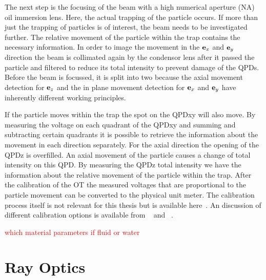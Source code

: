 The next step is the focusing of the beam with a high numerical aperture (NA) 
oil immersion lens. Here, the actual trapping of the particle occurs. If more 
than just the trapping of particles is of interest, the beam needs to be 
investigated further. The relative movement of the particle within the trap 
contains the necessary information. In order to image the movement in the $\vb{e}_{x}$ 
and $\vb{e}_{y}$ direction the beam is collimated again by the condensor lens after it 
passed the particle and filtered to reduce its total intensity to prevent 
damage of the QPDs. Before the beam is focussed, it is split into two because 
the axial movement detection for $\vb{e}_{z}$ and the in plane movement detection for 
$\vb{e}_{x}$ and $\vb{e}_{y}$ have inherently different working principles.

If the particle moves within the trap the spot on the QPDxy will also move. By 
measuring the voltage on each quadrant of the QPDxy and summing and subtracting 
certain quadrants it is possible to retrieve the information about the movement 
in each direction separately. For the axial direction the opening of the QPDz 
is overfilled. An axial movement of the particle causes a change of total 
intensity on this QPD. By measuring the QPDz total intensity we have the 
information about the relative movement of the particle within the trap. After 
the calibration of the OT the measured voltages that are proportional to the 
particle movement can be converted to the physical unit meter. The calibration 
process itself is not relevant for this thesis but is available 
here~\cite{Lamprecht2017}. An discussion of different calibration options is 
available from \citeauthor{Svoboda1994}~\cite{Svoboda1994} and 
\citeauthor{Jun2004}~\cite{Jun2004}.


\textcolor{red}{which material parameters if fluid or water}

\section{Ray Optics\label{sec:TO-rayoptics}}

